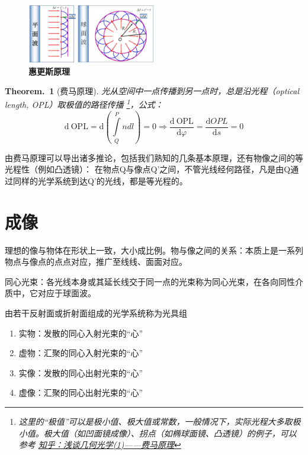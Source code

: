 \documentclass[UTF8]{report}
\theoremstyle{MyLineTheoremStyle} %
\theoremstyle{MyBlockTheoremStyle} %
\newtheorem{BlockTheorem}[LineTheorem]{Theorem.\,} %
\theoremstyle{MySubsubsectionStyle} %
\begin{document}
\begin{figure}[H]\centering
\includegraphics[width=0.5\textwidth]{assets/image (46).jpg}
\caption{\textbf{惠更斯原理}}\label{惠更斯原理}
\end{figure}

\begin{BlockTheorem}[费马原理]\label{费马原理}
光从空间中一点传播到另一点时，总是沿光程（optical length, OPL）取极值的路径传播 \footnote{这里的“极值”可以是极小值、极大值或常数，一般情况下，实际光程大多取极小值。极大值（如凹面镜成像）、拐点（如椭球面镜、凸透镜）的例子，可以参考 \href{https://zhuanlan.zhihu.com/p/107739173}{知乎：浅谈几何光学(1)——费马原理}}，公式：
\begin{equation}
    \mathrm{d}\ \mathrm{OPL} =  \mathrm{d}\left(\int\limits_{Q}^{P}ndl\right)=0 \Longrightarrow \frac{\mathrm{d}\  \mathrm{OPL} }{\mathrm{d} \varphi } = \frac{\mathrm{d} OPL }{\mathrm{d} s } = 0 
\end{equation}
\end{BlockTheorem}
由费马原理可以导出诸多推论，包括我们熟知的几条基本原理，还有物像之间的等光程性（例如凸透镜）：
在物点Q与像点Q’之间，不管光线经何路径，凡是由Q通过同样的光学系统到达Q’的光线，都是等光程的。

\section{成像}

理想的像与物体在形状上一致，大小成比例。物与像之间的关系：本质上是一系列物点与像点的点点对应，推广至线线、面面对应。

同心光束：各光线本身或其延长线交于同一点的光束称为同心光束，在各向同性介质中，它对应于球面波。

由若干反射面或折射面组成的光学系统称为光具组

\begin{enumerate}
\item 实物：发散的同心入射光束的“心”
\item 虚物：汇聚的同心入射光束的“心”
\item 实像：发散的同心出射光束的“心”
\item 虚像：汇聚的同心出射光束的“心”
\end{enumerate}
\end{document}
